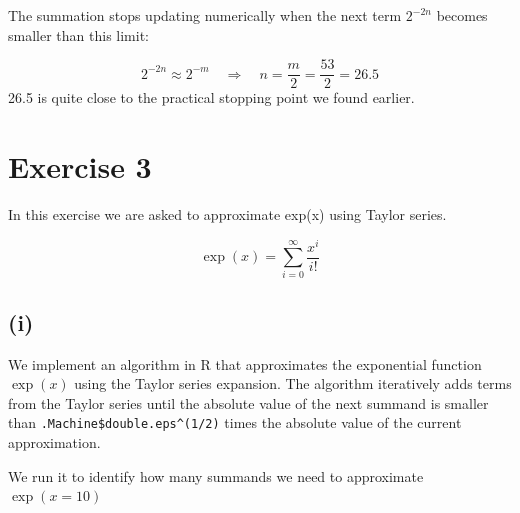 \documentclass[
]{article}
\begin{document}
The summation stops updating numerically when the next term \(2^{-2n}\)
becomes smaller than this limit:

\[
2^{-2n} \approx 2^{-m} \quad \Rightarrow \quad n = \frac{m}{2} = \frac{53}{2} = 26.5
\] 26.5 is quite close to the practical stopping point we found earlier.

\section{Exercise 3}\label{exercise-3}

In this exercise we are asked to approximate exp(x) using Taylor series.

\[
\exp(x) = \sum_{i=0}^{\infty} \frac{x^i}{i!}
\]

\subsection{(i)}\label{i}

We implement an algorithm in R that approximates the exponential
function \(\exp(x)\) using the Taylor series expansion. The algorithm
iteratively adds terms from the Taylor series until the absolute value
of the next summand is smaller than
\texttt{.Machine\$double.eps\textasciicircum(1/2)} times the absolute
value of the current approximation.

We run it to identify how many summands we need to approximate
\(\exp(x=10)\)
\end{document}
